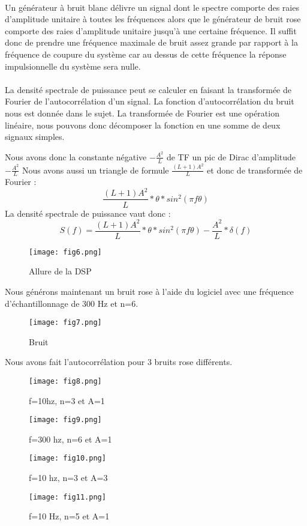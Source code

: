 \documentclass[oneside,a4paper,12pt]{article}
\begin{document}
	\paragraph{}
	Un générateur à bruit blanc délivre un signal dont le spectre comporte des raies d’amplitude unitaire à toutes les fréquences alors que le générateur de bruit rose comporte des raies d’amplitude unitaire jusqu’à une certaine fréquence. Il suffit donc de prendre une fréquence maximale de bruit assez grande par rapport à la fréquence de coupure du système car au dessus de cette fréquence la réponse impulsionnelle du système sera nulle.
	\paragraph{}
	La densité spectrale de puissance peut se calculer en faisant la transformée de Fourier de l’autocorrélation d’un signal. La fonction d’autocorrélation du bruit nous est donnée dans le sujet. La transformée de Fourier est une opération linéaire, nous pouvons donc décomposer la fonction en une somme de deux signaux simples.
	
	Nous avons donc la constante négative $-\frac{A^{2}}{L}$ de TF un pic de Dirac d’amplitude $-\frac{A^{2}}{L}$ Nous avons aussi un triangle de formule $\frac{(L+1)A^{2}}{L}$ et donc de transformée de Fourier :
	$$ \frac{(L+1)A^{2}}{L}*\theta*sin^{2}(\pi f \theta) $$
	La densité spectrale de puissance vaut donc :  
	$$ S(f)= \frac{(L+1)A^{2}}{L}*\theta*sin^{2}(\pi f \theta) - \frac{A^{2}}{L}*\delta(f)$$
	
	\begin{figure}[h]
		\centering
		\texttt{[image: fig6.png]}
		\caption{Allure de la DSP}
	\end{figure}

	Nous générons maintenant un bruit rose à l’aide du logiciel avec une fréquence d'échantillonnage de 300 Hz et n=6.\\
	
	\begin{figure}[h]
		\centering
		\texttt{[image: fig7.png]}
		\caption{Bruit}
	\end{figure}

	Nous avons fait l’autocorrélation pour 3 bruits rose différents.
	\begin{figure}[h]
		\centering
		\texttt{[image: fig8.png]}
		\caption{f=10hz, n=3 et A=1}
	\end{figure}
	\begin{figure}[h]
		\centering
		\texttt{[image: fig9.png]}
		\caption{f=300 hz, n=6 et A=1}
	\end{figure}
\newpage
	\begin{figure}[h]
		\centering
		\texttt{[image: fig10.png]}
		\caption{f=10 hz, n=3 et A=3}
	\end{figure}
	\begin{figure}[h]
		\centering
		\texttt{[image: fig11.png]}
		\caption{f=10 Hz, n=5 et A=1}
	\end{figure}
	\newpage
	
\end{document}
